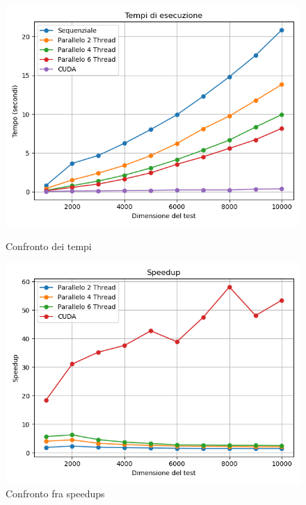 \documentclass[11pt]{article}
\begin{document}
    \begin{figure}[H]
        \centering
        \begin{minipage}{0.49\textwidth}
            \centering
            \includegraphics[width=\textwidth]{plots/256/results_times}
            \caption{Confronto dei tempi}\label{fig:tempi-256}
        \end{minipage}
        \begin{minipage}{0.49\textwidth}
            \centering
            \includegraphics[width=\textwidth]{plots/256/results_speedup}
            \caption{Confronto fra speedups}\label{fig:speedups-256}
        \end{minipage}
    \end{figure}
\end{document}
